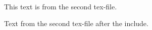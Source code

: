 \documentclass[12pt,a4paper]{article}
\begin{document}
This text is from the second tex-file.

    
Text from the second tex-file after the include.
\end{document}

